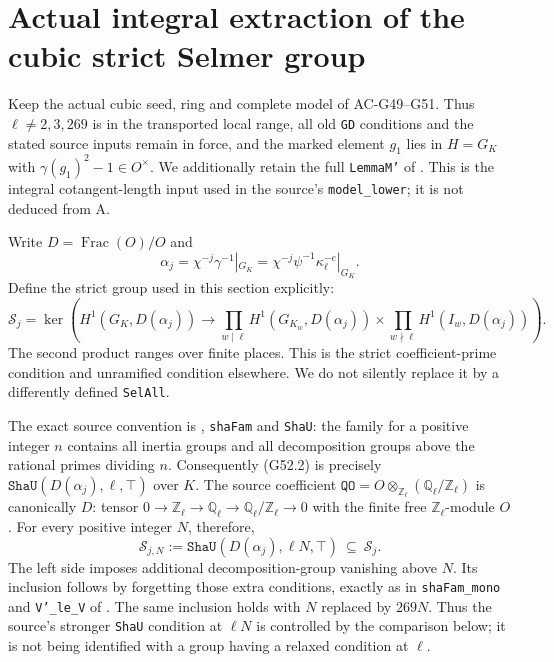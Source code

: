 \section{Actual integral extraction of the cubic strict Selmer group}
\label{sec:cubic-selmer-extraction}

Keep the actual cubic seed, ring and complete model of
AC-G49--G51.  Thus $\ell\ne2,3,269$ is in the transported
local range, all old \texttt{GD} conditions and the stated
source inputs remain in force, and the marked element
$g_1$ lies in $H=G_K$ with
$\gamma(g_1)^2-1\in O^\times$.
We additionally retain the full \texttt{LemmaM'} of
.
This is the integral cotangent-length input used in the
source's \texttt{model\_lower}; it is not deduced from A.

Write $D=\operatorname{Frac}(O)/O$ and
\[
 \alpha_j=\chi^{-j}\gamma^{-1}|_{G_K}
       =\chi^{-j}\psi^{-1}\kappa_\ell^{-e}|_{G_K}.
                                                               \tag{G52.1}
\]
Define the strict group used in this section explicitly:
\[
 \mathcal S_j=
 \ker\!\left(
 H^1(G_K,D(\alpha_j))\longrightarrow
 \prod_{w\mid\ell}H^1(G_{K_w},D(\alpha_j))
 \times\prod_{w\nmid\ell}H^1(I_w,D(\alpha_j))
 \right).
                                                               \tag{G52.2}
\]
The second product ranges over finite places.
This is the strict coefficient-prime condition and
unramified condition elsewhere.  We do not silently
replace it by a differently defined \texttt{SelAll}.

The exact source convention is
,
\texttt{shaFam} and \texttt{ShaU}: the family for a positive
integer $n$ contains all inertia groups and all decomposition
groups above the rational primes dividing $n$.
Consequently (G52.2) is precisely
$\texttt{ShaU}(D(\alpha_j),\ell,\top)$ over $K$.
The source coefficient $\texttt{QO}=O\otimes_{\mathbb Z_\ell}
(\mathbb Q_\ell/\mathbb Z_\ell)$ is canonically $D$:
tensor $0\to\mathbb Z_\ell\to\mathbb Q_\ell
\to\mathbb Q_\ell/\mathbb Z_\ell\to0$ with the finite free
$\mathbb Z_\ell$-module $O$.
For every positive integer $N$, therefore,
\[
 \mathcal S_{j,N}:=
 \texttt{ShaU}(D(\alpha_j),\ell N,\top)
       \ \subseteq\ \mathcal S_j.
\]
The left side imposes additional decomposition-group vanishing
above $N$.  Its inclusion follows by forgetting those extra
conditions, exactly as in \texttt{shaFam\_mono} and
\texttt{V'\_le\_V} of
.
The same inclusion holds with $N$ replaced by $269N$.
Thus the source's stronger \texttt{ShaU} condition at
$\ell N$ is controlled by the comparison below; it is not
being identified with a group having a relaxed condition at
$\ell$.

